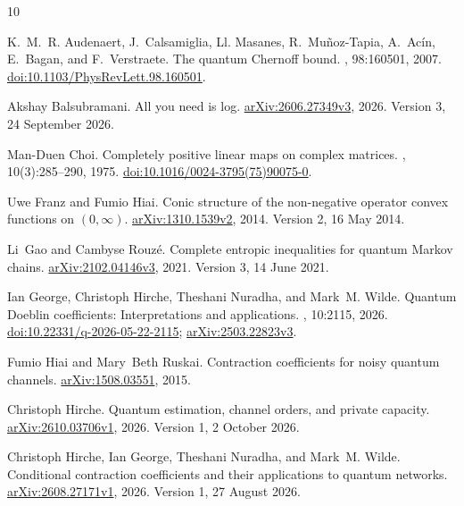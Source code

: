 \documentclass[11pt]{article}
\numberwithin{equation}{section}
\theoremstyle{definition}
\theoremstyle{remark}
\begin{document}
{\small\raggedright

\begin{thebibliography}{10}

K.~M.~R. Audenaert, J.~Calsamiglia, Ll. Masanes, R.~Mu{\~n}oz-Tapia,
  A.~Ac{\'i}n, E.~Bagan, and F.~Verstraete.
\newblock The quantum {Chernoff} bound.
, 98:160501, 2007.
\newblock
  \href{https://doi.org/10.1103/PhysRevLett.98.160501}{doi:10.1103/PhysRevLett.98.160501}.

Akshay Balsubramani.
\newblock All you need is log.
\newblock \href{https://arxiv.org/abs/2606.27349v3}{arXiv:2606.27349v3}, 2026.
\newblock Version 3, 24 September 2026.

Man-Duen Choi.
\newblock Completely positive linear maps on complex matrices.
, 10(3):285--290, 1975.
\newblock
  \href{https://doi.org/10.1016/0024-3795(75)90075-0}{doi:10.1016/0024-3795(75)90075-0}.

Uwe Franz and Fumio Hiai.
\newblock Conic structure of the non-negative operator convex functions on
  $(0,\infty)$.
\newblock \href{https://arxiv.org/abs/1310.1539v2}{arXiv:1310.1539v2}, 2014.
\newblock Version 2, 16 May 2014.

Li~Gao and Cambyse Rouz{\'e}.
\newblock Complete entropic inequalities for quantum {Markov} chains.
\newblock \href{https://arxiv.org/abs/2102.04146v3}{arXiv:2102.04146v3}, 2021.
\newblock Version 3, 14 June 2021.

Ian George, Christoph Hirche, Theshani Nuradha, and Mark~M. Wilde.
\newblock Quantum {Doeblin} coefficients: Interpretations and applications.
, 10:2115, 2026.
\newblock
  \href{https://doi.org/10.22331/q-2026-05-22-2115}{doi:10.22331/q-2026-05-22-2115};
  \href{https://arxiv.org/abs/2503.22823v3}{arXiv:2503.22823v3}.

Fumio Hiai and Mary~Beth Ruskai.
\newblock Contraction coefficients for noisy quantum channels.
\newblock \href{https://arxiv.org/abs/1508.03551}{arXiv:1508.03551}, 2015.

Christoph Hirche.
\newblock Quantum estimation, channel orders, and private capacity.
\newblock \href{https://arxiv.org/abs/2610.03706v1}{arXiv:2610.03706v1}, 2026.
\newblock Version 1, 2 October 2026.

Christoph Hirche, Ian George, Theshani Nuradha, and Mark~M. Wilde.
\newblock Conditional contraction coefficients and their applications to
  quantum networks.
\newblock \href{https://arxiv.org/abs/2608.27171v1}{arXiv:2608.27171v1}, 2026.
\newblock Version 1, 27 August 2026.


\end{thebibliography}}
\end{document}
